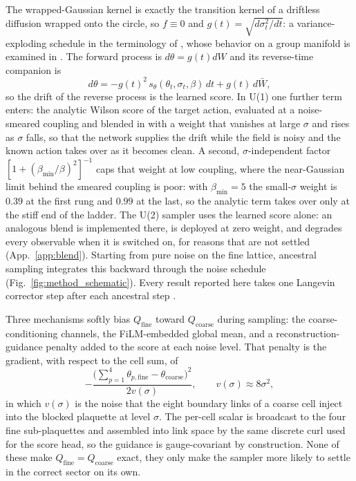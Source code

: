 \documentclass[prd, twocolumn, superscriptaddress, nofootinbib,floatfix]{revtex4-2}
\DeclareRobustCommand{\fig}[1]{Fig.~\ref{fig:#1}}
\DeclareRobustCommand{\app}[1]{App.~\ref{app:#1}}
\begin{document}
The wrapped-Gaussian kernel is exactly the transition kernel of a driftless
diffusion wrapped onto the circle, so $f\equiv0$ and
$g(t)=\sqrt{d\sigma_t^2/dt}$: a variance-exploding schedule in the terminology of
\cite{song2021}, whose behavior on a group manifold is examined in
\cite{komijani2026noise}. The forward process is $d\theta = g(t)dW$ and its
reverse-time companion is
\begin{equation}
    d\theta = -g(t)^2\,s_\theta(\theta_t,\sigma_t,\beta)\,dt + g(t)\,d\bar W,
    \label{eq:reverse-sde}
\end{equation}
so the drift of the reverse process is the learned score. In U(1) one further
term enters: the analytic Wilson score of the target action, evaluated at a
noise-smeared coupling and blended in with a weight that vanishes at large
$\sigma$ and rises as $\sigma$ falls, so that the network supplies the drift
while the field is noisy and the known action takes over as it becomes clean.
A second, $\sigma$-independent factor $[1+(\beta_{\min}/\beta)^2]^{-1}$ caps
that weight at low coupling, where the near-Gaussian limit behind the smeared
coupling is poor: with $\beta_{\min}=5$ the small-$\sigma$ weight is $0.39$ at
the first rung and $0.99$ at the last, so the analytic term takes over only at
the stiff end of the ladder. The U(2) sampler uses the learned score alone: an
analogous blend is implemented there, is deployed at zero weight, and degrades every
observable when it is switched on, for reasons that are not settled
(\app{blend}). Starting from pure noise
on the fine lattice, ancestral sampling integrates this backward through the
noise schedule (\fig{method_schematic}). Every result reported here takes one
Langevin corrector step after each ancestral step \cite{song2021}.

Three mechanisms softly bias $Q_{\mathrm{fine}}$ toward $Q_{\mathrm{coarse}}$
during sampling: the coarse-conditioning channels, the FiLM-embedded global
mean, and a reconstruction-guidance penalty \cite{ho2022} added to the score at each noise
level. That penalty is the gradient, with respect to the cell sum, of
\begin{equation}
    -\frac{\big(\sum_{p=1}^4\theta_{p,\mathrm{fine}}
        - \theta_{\mathrm{coarse}}\big)^2}{2v(\sigma)},
    \qquad v(\sigma)\approx 8\sigma^2,
    \label{eq:guidance}
\end{equation}
in which $v(\sigma)$ is the noise that the eight boundary links of a coarse
cell inject into the blocked plaquette at level $\sigma$. The per-cell scalar is broadcast to the four fine sub-plaquettes and
assembled into link space by the same discrete curl used for the score head, so
the guidance is gauge-covariant by construction. None of these make $Q_{\mathrm{fine}}=Q_{\mathrm{coarse}}$ exact, they only
make the sampler more likely to settle in the correct sector on its own.
\end{document}

